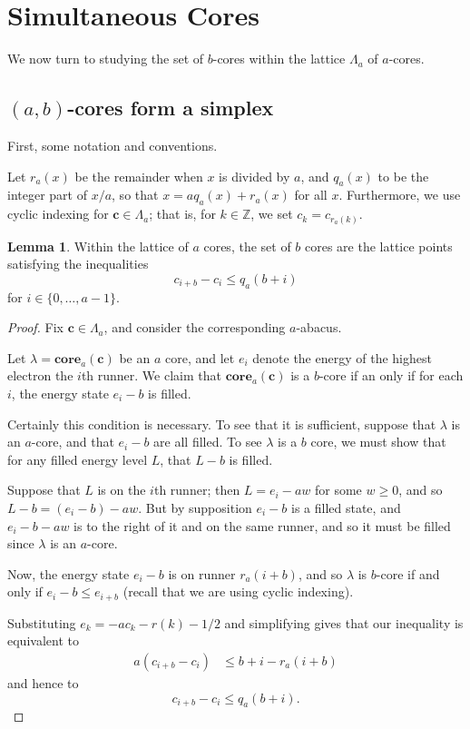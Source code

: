 \documentclass{amsart}[12pt]
\theoremstyle{definition}
\newtheorem{lemma}[dummy]{Lemma}
\newcommand{\Z}{\mathbb{Z}}
\newcommand{\core}{\mathbf{core}}
\begin{document}
\section{Simultaneous Cores} \label{sec:numberandsize}

We now turn to studying the set of $b$-cores within the lattice
$\Lambda_a$ of $a$-cores.
\subsection{\texorpdfstring{$(a,b)$}{(a,b)}-cores form a simplex}

First, some notation and conventions.

Let $r_a(x)$ be the remainder when $x$ is divided by $a$, and $q_a(x)$ to be the integer part of $x/a$, so that $x=aq_a(x)+r_a(x)$ for all $x$.
Furthermore, we use cyclic indexing for $\mathbf{c}\in\Lambda_a$;
that is, for $k\in\Z$, we set $c_k=c_{r_a(k)}$.

\begin{lemma}
Within the lattice of $a$ cores, the set of $b$ cores are the
lattice points satisfying the inequalities $$c_{i+b}-c_{i}\leq q_a(b+i)$$
for $i\in\{0,\dots,a-1\}$.
\end{lemma}

\begin{proof}

Fix $\mathbf{c}\in\Lambda_a$, and consider the corresponding
$a$-abacus.

Let $\lambda=\core_a(\mathbf{c})$ be an $a$ core, and let $e_i$ denote the energy of the highest electron the $i$th runner.  We claim that $\core_a(\mathbf{c})$ is a $b$-core if an only if for each $i$, the energy state $e_i-b$ is filled.

Certainly this condition is necessary.  To see that it is sufficient, suppose that $\lambda$ is an $a$-core, and that $e_i-b$ are all filled.  To see $\lambda$ is a $b$ core, we must show that for any filled energy level $L$, that $L-b$ is filled.  

Suppose that $L$ is on the $i$th runner; then $L=e_i-aw$ for some $w\geq 0$, and so $L-b=(e_i-b)-aw$.  But by supposition $e_i-b$ is a filled state, and $e_i-b-aw$ is to the right of it and on the same runner, and so it must be filled since $\lambda$ is an $a$-core.

Now, the energy state $e_{i}-b$ is on runner $r_a(i+b)$, and so
$\lambda$ is $b$-core if and only if $e_{i}-b\leq e_{i+b}$ (recall that we are using cyclic indexing).

Substituting $e_k=-ac_k-r(k)-1/2$ and simplifying gives that our inequality is equivalent to
\begin{align*}
a(c_{i+b}-c_i)& \leq b+i-r_a(i+b)
\end{align*}
and hence to
$$c_{i+b}-c_i \leq q_a(b+i).$$

\end{proof}
\end{document}
